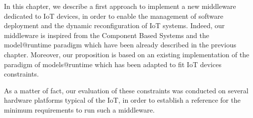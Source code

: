 
In this chapter, we describe a first approach to implement a new middleware dedicated to IoT devices, in order to enable the management of software deployment and the dynamic reconfiguration of IoT systems.
Indeed, our middleware is inspired from the Component Based Systems and the model@runtime paradigm which have been already described in the previous chapter.
Moreover, our proposition is based on an existing implementation of the paradigm of models@runtime which has been adapted to fit IoT devices constraints.

As a matter of fact, our evaluation of these constraints was conducted on several hardware platforms typical of the IoT, in order to establish a reference for the minimum requirements to run such a middleware.

